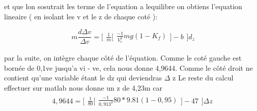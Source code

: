 \documentclass{article}
\begin{document}
et que lon sosutrait les terme de l'equation a lequilibre on obtiens l'equation lineaire  ( en isolant les v et le z de chaque coté ):

\begin{equation}
\ m \frac{d \Delta v}{\Delta v}= \Bigg[\begin{array}{cc} \frac{1}{m} \Bigg[\begin{array}{cc}
    \frac{-1}{V_{e}^2}mg(1-K_{f})
    \end{array}\Bigg]  - b\end{array}\Bigg] d_{z}
\end{equation}

par la suite, on intègre chaque côté de l'équation. Comme le coté gauche est bornée de 0,1ve jusqu'a vi - ve, cela nous donne 4,9644. Comme le côté droit ne contient qu'une variable étant le dz qui deviendras $\Delta$ z
 Le reste du calcul effectuer sur matlab nous donne un z de 4,23m car 
 \begin{equation}
 4,9644 = \Bigg[\begin{array}{cc} \frac{1}{80} \Bigg[\begin{array}{cc}
    \frac{-1}{0,913^2}80*9.81(1-0,95)
    \end{array}\Bigg]  - 47\end{array}\Bigg] \Delta z
 \end{equation}
 
 
\end{document}

